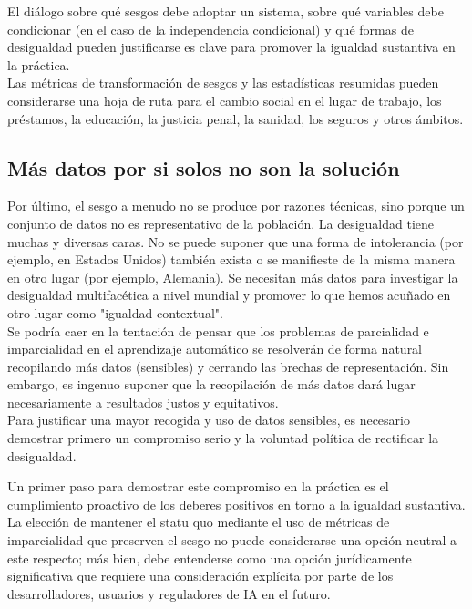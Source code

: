 El diálogo sobre qué sesgos debe adoptar un sistema, sobre qué variables debe condicionar (en el caso de la independencia condicional) y qué formas de desigualdad pueden justificarse es clave para promover la igualdad sustantiva en la práctica.\\

Las métricas de transformación de sesgos y las estadísticas resumidas pueden considerarse una hoja de ruta para el cambio social en el lugar de trabajo, los préstamos, la educación, la justicia penal, la sanidad, los seguros y otros ámbitos.

\subsection{Más datos por si solos no son la solución}
Por último, el sesgo a menudo no se produce por razones técnicas, sino porque un conjunto de datos no es representativo de la población. La desigualdad tiene muchas y diversas caras. No se puede suponer que una forma de intolerancia (por ejemplo, en Estados Unidos) también exista o se manifieste de la misma manera en otro lugar (por ejemplo, Alemania). Se necesitan más datos para investigar la desigualdad multifacética a nivel mundial y promover lo que hemos acuñado en otro lugar como "igualdad contextual".\\

Se podría caer en la tentación de pensar que los problemas de parcialidad e imparcialidad en el aprendizaje automático se resolverán de forma natural recopilando más datos (sensibles) y cerrando las brechas de representación. Sin embargo, es ingenuo suponer que la recopilación de más datos dará lugar necesariamente a resultados justos y equitativos.\\

Para justificar una mayor recogida y uso de datos sensibles, es necesario demostrar primero un compromiso serio y la voluntad política de rectificar la desigualdad. 

Un primer paso para demostrar este compromiso en la práctica es el cumplimiento proactivo de los deberes positivos en torno a la igualdad sustantiva. La elección de mantener el statu quo mediante el uso de métricas de imparcialidad que preserven el sesgo no puede considerarse una opción neutral a este respecto; más bien, debe entenderse como una opción jurídicamente significativa que requiere una consideración explícita por parte de los desarrolladores, usuarios y reguladores de IA en el futuro.


